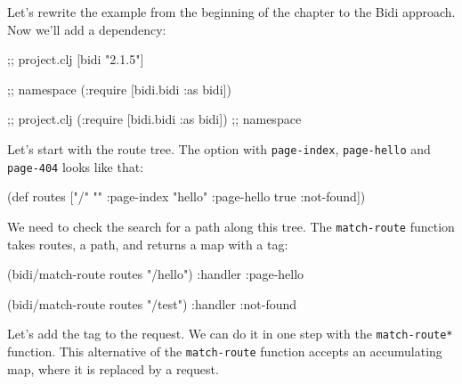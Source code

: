 
Let's rewrite the example from the beginning of the chapter to the Bidi approach. Now we'll add a dependency:

\ifx\DEVICETYPE\MOBILE

\begin{english}
  \begin{clojure}
;; project.clj
[bidi "2.1.5"]

;; namespace
(:require [bidi.bidi :as bidi])
  \end{clojure}
\end{english}

\else

\begin{english}
  \begin{clojure}
[bidi "2.1.5"]                  ;; project.clj
(:require [bidi.bidi :as bidi]) ;; namespace
  \end{clojure}
\end{english}

\fi

Let's start with the route tree. The option with \verb|page-index|, \verb|page-hello| and \verb|page-404| looks like that:

\begin{english}
  \begin{clojure}
(def routes
  ["/" {""      :page-index
        "hello" :page-hello
        true    :not-found}])
  \end{clojure}
\end{english}


We need to check the search for a path along this tree. The \verb|match-route| function takes routes, a path, and returns a map with a tag:

\begin{english}
  \begin{clojure}
(bidi/match-route routes "/hello")
{:handler :page-hello}

(bidi/match-route routes "/test")
{:handler :not-found}
  \end{clojure}
\end{english}


Let's add the tag to the request. We can do it in one step with the \verb|match-route*| function. This alternative of the \verb|match-route| function accepts an accumulating map, where it is replaced by a request.

